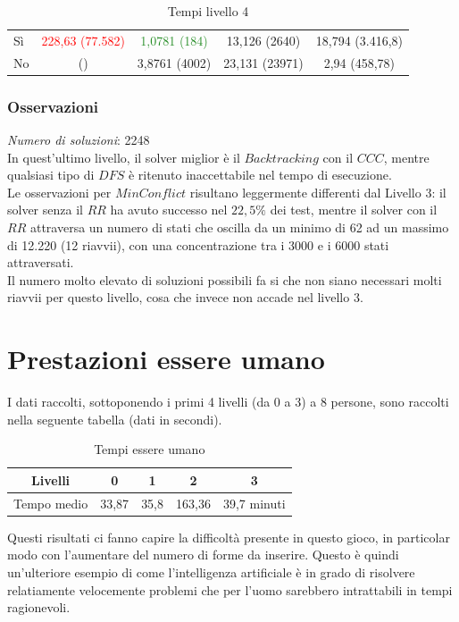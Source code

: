  \begin{table}[h] 
	\begin{tabular}{|l||*{4}{c|}}\hline 
		\backslashbox{Miglioria}{Solver} 
		&\makebox{DFS}&\makebox{Backtracking}&\makebox{Recursive Backtracking}	&\makebox{MinConflict}\\ \hline 
		Sì&\textcolor{red}{228,63 (77.582)}&\textcolor{ForestGreen}{1,0781 (184)}&13,126 (2640)&18,794 (3.416,8) \\ \hline 
		No& ()&3,8761 (4002)&23,131 (23971)&2,94 (458,78)  \\ \hline 
	\end{tabular} 
	\caption{Tempi livello 4}
\end{table}

\subsubsection{Osservazioni}

\textit{Numero di soluzioni}: 2248\\

In quest'ultimo livello, il solver miglior è il $Backtracking$ con il $CCC$, mentre qualsiasi tipo di $DFS$ è ritenuto inaccettabile nel tempo di esecuzione.\\

Le osservazioni per $MinConflict$ risultano leggermente differenti dal Livello 3: il solver senza il $RR$ ha avuto successo nel $22,5\%$ dei test, mentre il solver con il $RR$ attraversa un numero di stati che oscilla da un minimo di 62 ad un massimo di 12.220 (12 riavvii), con una concentrazione tra i 3000 e i 6000 stati attraversati.\\
Il numero molto elevato di soluzioni possibili fa si che non siano necessari molti riavvii per questo livello, cosa che invece non accade nel livello 3.

\section{Prestazioni essere umano}
\label{human}
I dati raccolti, sottoponendo i primi 4 livelli (da 0 a 3) a 8 persone, sono raccolti nella seguente tabella (dati in secondi).


\begin{table}[h]
	\centering
	\begin{tabular}{lllll}
		\hline
		\multicolumn{1}{|c|}{Livelli}     & \multicolumn{1}{c|}{0}     & \multicolumn{1}{c|}{1}    & \multicolumn{1}{c|}{2}      & \multicolumn{1}{c|}{3}           \\ \hline
		\multicolumn{1}{|c|}{Tempo medio} & \multicolumn{1}{c|}{33,87} & \multicolumn{1}{c|}{35,8} & \multicolumn{1}{c|}{163,36} & \multicolumn{1}{c|}{39,7 minuti} \\ \hline                               
	\end{tabular}
	\caption{Tempi essere umano}
\end{table}
Questi risultati ci fanno capire la difficoltà presente in questo gioco, in particolar modo con l'aumentare del numero di forme da inserire. Questo è quindi un'ulteriore esempio di come l'intelligenza artificiale è in grado di risolvere relatiamente velocemente problemi che per l'uomo sarebbero intrattabili in tempi ragionevoli. 
